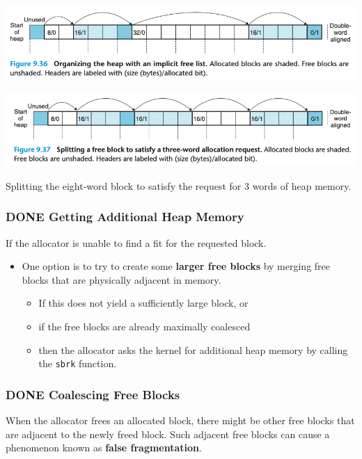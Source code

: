 \documentclass[11pt]{article}
\begin{document}
\begin{center}
\includegraphics[width=.9\linewidth]{pics/figure9.36-implicit-free-list.png}
\end{center}

\begin{center}
\includegraphics[width=.9\linewidth]{pics/figure9.37-split.png}
\end{center}

Splitting the eight-word block to satisfy the request for 3 words of heap memory.\\

\subsubsection{{\bfseries\sffamily DONE} Getting Additional Heap Memory}
\label{sec:org200379e}

If the allocator is unable to find a fit for the requested block.\\
\begin{itemize}
\item One option is to try to create some \textbf{larger free blocks} by merging free blocks that are physically adjacent in memory.\\
\begin{itemize}
\item If this does not yield a sufficiently large block, or\\
\item if the free blocks are already maximally coalesced\\
\item then the allocator asks the kernel for additional heap memory by calling the \texttt{sbrk} function.\\
\end{itemize}
\end{itemize}


\subsubsection{{\bfseries\sffamily DONE} Coalescing Free Blocks}
\label{sec:org3b869c9}
When the allocator frees an allocated block, there might be other free blocks that are adjacent to the newly freed block. Such adjacent free blocks can cause a phenomenon known as \textbf{false fragmentation}.\\
\end{document}
